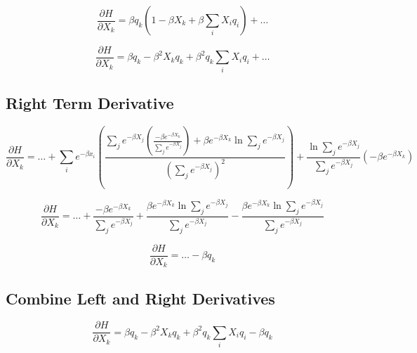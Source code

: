 \begin{displaymath}
    \frac{\partial H}{\partial X_{k}} = \beta q_{k} \left(1 - \beta X_{k} + \beta \sum_{i}X_{i}q_{i}\right) + \ldots
\end{displaymath}

\begin{displaymath}
    \frac{\partial H}{\partial X_{k}} = \beta q_{k} - \beta^{2}X_{k}q_{k} + \beta^{2}q_{k}\sum_{i}X_{i}q_{i} + \ldots
\end{displaymath}

\subsection{Right Term Derivative}

\begin{displaymath}
    \frac{\partial H}{\partial X_{k}} = \ldots + 
    \sum_{i}e^{-\beta x_{i}} \left(\frac{\sum_{j}e^{-\beta X_{j}} \left(\frac{-\beta e^{-\beta X_{k}}}{\sum_{j}e^{-\beta X_{j}}}\right)
    + \beta e^{-\beta X_{k}}\ln{\sum_{j}e^{-\beta X_{j}}}}{\left(\sum_{j}e^{-\beta X_{j}}\right)^{2}}\right)
    + \frac{\ln{\sum_{j}e^{-\beta X_{j}}}}{\sum_{j}e^{-\beta X_{j}}}\left(-\beta e^{-\beta X_{k}}\right)
\end{displaymath}

\begin{displaymath}
    \frac{\partial H}{\partial X_{k}} = \ldots + 
    \frac{-\beta e^{-\beta X_{k}}}{\sum_{j}e^{-\beta X_{j}}}
    + \frac{\beta e^{-\beta X_{k}}\ln{\sum_{j}e^{-\beta X_{j}}}}{\sum_{j}e^{-\beta X_{j}}}
    - \frac{\beta e^{-\beta X_{k}} \ln{\sum_{j}e^{-\beta X_{j}}}}{\sum_{j}e^{-\beta X_{j}}}
\end{displaymath}

\begin{equation}
    \frac{\partial H}{\partial X_{k}} = \ldots - \beta q_{k}
\label{rightd}
\end{equation}

\subsection{Combine Left and Right Derivatives}

\begin{displaymath}
    \frac{\partial H}{\partial X_{k}} = \beta q_{k} - \beta^{2} X_{k} q_{k} + \beta^{2} q_{k} \sum_{i}X_{i}q_{i} - \beta q_{k}
\end{displaymath}

